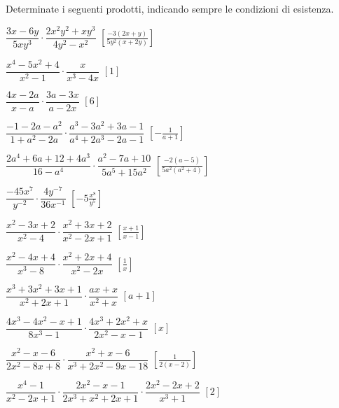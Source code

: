 \begin{esercizio}[\Ast]
\label{ese:19.13}
Determinate i seguenti prodotti, indicando sempre le condizioni di esistenza.
\begin{enumeratea}
 \item $\dfrac{3x-6y}{5xy^{3}}\cdot\dfrac{2x^{2}y^{2}+xy^{3}}{4y^{2}-x^{2}}$
 \hfill $\left[\frac{-{3(2x+y)}}{5y^{2}(x+2y)}\right]$
 \item $\dfrac{x^{4}-5x^{2}+4}{x^{2}-1}\cdot\dfrac{x}{x^{3}-4x}$
 \hfill $\left[1\right]$
 \item $\dfrac{4x-2a}{x-a}\cdot\dfrac{3a-3x}{a-2x}$
 \hfill $\left[6\right]$
 \item $\dfrac{-1-2a-a^{2}}{1+a^{2}-2a}\cdot
        \dfrac{a^{3}-3a^{2}+3a-1}{a^{4}+2a^{3}-2a-1}$
 \hfill $\left[-{\frac{1}{a+1}}\right]$
 \item $\dfrac{2a^{4}+6a+12+4a^{3}}{16-a^{4}}\cdot
        \dfrac{a^{2}-7a+10}{5a^{5}+15a^{2}}$
 \hfill $\left[\frac{-{2(a-5)}}{5a^{2}(a^{2}+4)}\right]$
 \item $\dfrac{-45x^{7}}{y^{-2}}\cdot\dfrac{4y^{-7}}{36x^{-1}}$
 \hfill $\left[-5\frac{x^{8}}{y^{5}}\right]$
 \item $\dfrac{x^{2}-3x+2}{x^{2}-4}\cdot\dfrac{x^{2}+3x+2}{x^{2}-2x+1}$
 \hfill $\left[\frac{x+1}{x-1}\right]$
 \item $\dfrac{x^{2}-4x+4}{x^{3}-8}\cdot\dfrac{x^{2}+2x+4}{x^{2}-2x}$
 \hfill $\left[\frac{1}{x}\right]$
 \item $\dfrac{x^{3}+3x^{2}+3x+1}{x^{2}+2x+1}\cdot \dfrac{ax+x}{x^{2}+x}$
 \hfill $\left[a+1\right]$
 \item $\dfrac{4x^{3}-4x^{2}-x+1}{8x^{3}-1}\cdot
        \dfrac{4x^{3}+2x^{2}+x}{2x^{2}-x-1}$
 \hfill $\left[x\right]$
 \item $\dfrac{x^{2}-x-6}{2x^{2}-8x+8}\cdot
        \dfrac{x^{2}+x-6}{x^{3}+2x^{2}-9x-18}$
 \hfill $\left[\frac{1}{2(x-2)}\right]$
 \item $\dfrac{x^{4}-1}{x^{2}-2x+1}\cdot
        \dfrac{2x^{2}-x-1}{2x^{3}+x^{2}+2x+1}\cdot
        \dfrac{2x^{2}-2x+2}{x^{3}+1}$
 \hfill $\left[2\right]$
\end{enumeratea}
\end{esercizio}

\newpage %

